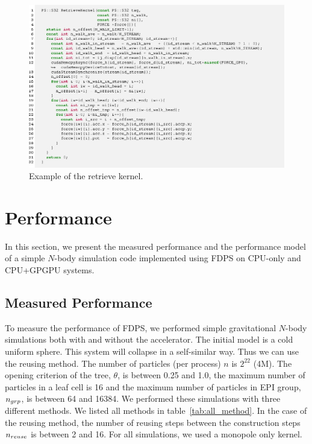\documentclass[dvipdfmx]{pasj01}
\begin{document}
\begin{figure}
    \begin{center}
      \includegraphics[width=13cm]{./fig/snipet/src_retrieve.eps}
    \end{center}
    \caption{Example of the retrieve kernel.}
  \label{fig:retrieve}
\end{figure}





\section{Performance}
\label{sect:performance}

In this section, we present the measured performance and the
performance model of a simple $N$-body simulation code implemented
using FDPS on CPU-only and CPU+GPGPU systems.

\subsection{Measured Performance}
\label{sect:measuredperformance}

To measure the performance of FDPS, we performed simple gravitational
$N$-body simulations both with and without the accelerator. The
initial model is a cold uniform sphere. This system will collapse in a
self-similar way. Thus we can use the reusing method. The number of
particles (per process) $n$ is $2^{22}$ (4M). The opening criterion of
the tree, $\theta$, is between 0.25 and 1.0, the maximum number of
particles in a leaf cell is 16 and the maximum number of particles in
EPI group, ${n_{\rm grp}}$, is between 64 and 16384. We performed
these simulations with three different methods. We listed all methods
in table~\ref{tab:all_method}. In the case of the reusing method, the
number of reusing steps between the construction steps ${n_{\rm
    reuse}}$ is between 2 and 16. For all simulations, we used a
monopole only kernel.
\end{document}
